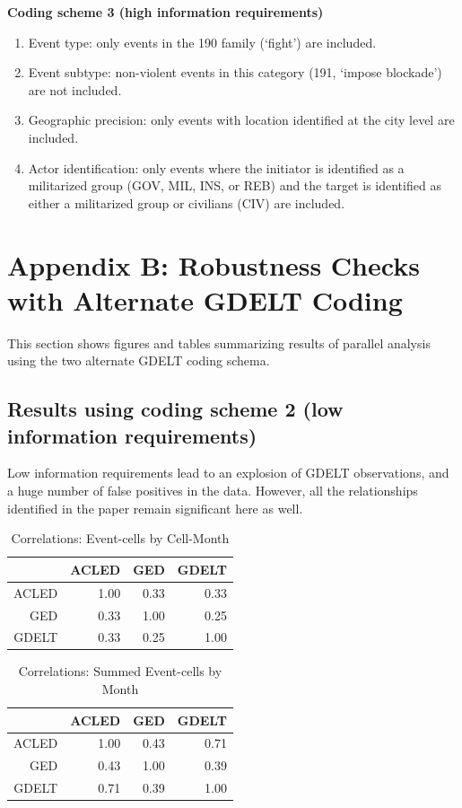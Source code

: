 \documentclass[hidelinks]{article}
\begin{document}
\textbf{Coding scheme 3 (high information requirements)}
\begin{enumerate}
\item Event type: only events in the 190 family (`fight') are included.
\item Event subtype: non-violent events in this category (191, `impose blockade') are not included.
\item Geographic precision: only events with location identified at the city level are included.
\item Actor identification: only events where the initiator is identified as a militarized group (GOV, MIL, INS, or REB) and the target is identified as either a militarized group or civilians (CIV) are included.
\end{enumerate}

\pagebreak

\section*{Appendix B: Robustness Checks with Alternate GDELT Coding}
This section shows figures and tables summarizing results of parallel analysis using the two alternate GDELT coding schema.

\subsection*{Results using coding scheme 2 (low information requirements)}
Low information requirements lead to an explosion of GDELT observations, and a huge number of false positives in the data. However, all the relationships identified in the paper remain significant here as well.

\begin{table}[ht]
\centering
\begin{tabular}{rrrr}
  \hline
 & ACLED & GED & GDELT\\ 
  \hline
ACLED & 1.00 & 0.33 & 0.33 \\ 
GED & 0.33 & 1.00 & 0.25 \\ 
GDELT & 0.33 & 0.25 & 1.00 \\ 
   \hline
\end{tabular}
\caption{Correlations: Event-cells by Cell-Month} 
\end{table}

\begin{table}[ht]
\centering
\begin{tabular}{rrrr}
  \hline
 & ACLED & GED & GDELT\\ 
  \hline
ACLED & 1.00 & 0.43 & 0.71 \\ 
GED & 0.43 & 1.00 & 0.39 \\ 
GDELT & 0.71 & 0.39 & 1.00 \\ 
   \hline
\end{tabular}
\caption{Correlations: Summed Event-cells by Month} 
\end{table}
\end{document}
